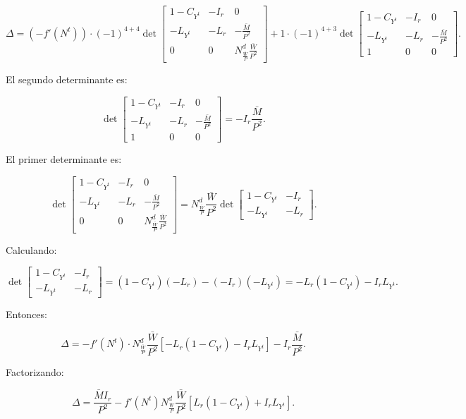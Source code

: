 \documentclass[
  doc,
  floatsintext,
  longtable,
  a4paper,
  nolmodern,
  notxfonts,
  notimes,
  colorlinks=true,linkcolor=blue,citecolor=blue,urlcolor=blue]{apa7}
\begin{document}
\begin{enumerate}
  \[
  \Delta = (-f'(N^t)) \cdot (-1)^{4+4} \det \begin{bmatrix}
  1 - C_{Y^t} & -I_r & 0 \\
  -L_{Y^t} & -L_r & -\frac{\bar{M}}{P^2} \\
  0 & 0 & N^d_{\frac{\bar{W}}{P}} \frac{\bar{W}}{P^2}
  \end{bmatrix}
  + 1 \cdot (-1)^{4+3} \det \begin{bmatrix}
  1 - C_{Y^t} & -I_r & 0 \\
  -L_{Y^t} & -L_r & -\frac{\bar{M}}{P^2} \\
  1 & 0 & 0
  \end{bmatrix}.
  \]

  El segundo determinante es:

  \[
  \det \begin{bmatrix}
  1 - C_{Y^t} & -I_r & 0 \\
  -L_{Y^t} & -L_r & -\frac{\bar{M}}{P^2} \\
  1 & 0 & 0
  \end{bmatrix} = -I_r \frac{\bar{M}}{P^2}.
  \]

  El primer determinante es:

  \[
  \det \begin{bmatrix}
  1 - C_{Y^t} & -I_r & 0 \\
  -L_{Y^t} & -L_r & -\frac{\bar{M}}{P^2} \\
  0 & 0 & N^d_{\frac{\bar{W}}{P}} \frac{\bar{W}}{P^2}
  \end{bmatrix} = N^d_{\frac{\bar{W}}{P}} \frac{\bar{W}}{P^2} \det \begin{bmatrix}
  1 - C_{Y^t} & -I_r \\
  -L_{Y^t} & -L_r
  \end{bmatrix}.
  \]

  Calculando:

  \[
  \det \begin{bmatrix}
  1 - C_{Y^t} & -I_r \\
  -L_{Y^t} & -L_r
  \end{bmatrix} = (1 - C_{Y^t})(-L_r) - (-I_r)(-L_{Y^t}) = -L_r (1 - C_{Y^t}) - I_r L_{Y^t}.
  \]

  Entonces:

  \[
  \Delta = -f'(N^t) \cdot N^d_{\frac{\bar{W}}{P}} \frac{\bar{W}}{P^2} \left[ -L_r (1 - C_{Y^t}) - I_r L_{Y^t} \right] - I_r \frac{\bar{M}}{P^2}.
  \]

  Factorizando:

  \[
  \Delta = \frac{\bar{M} I_r}{P^2} - f'(N^t) N^d_{\frac{\bar{W}}{P}} \frac{\bar{W}}{P^2} \left[ L_r (1 - C_{Y^t}) + I_r L_{Y^t} \right].
  \]


\end{enumerate}
\end{document}
